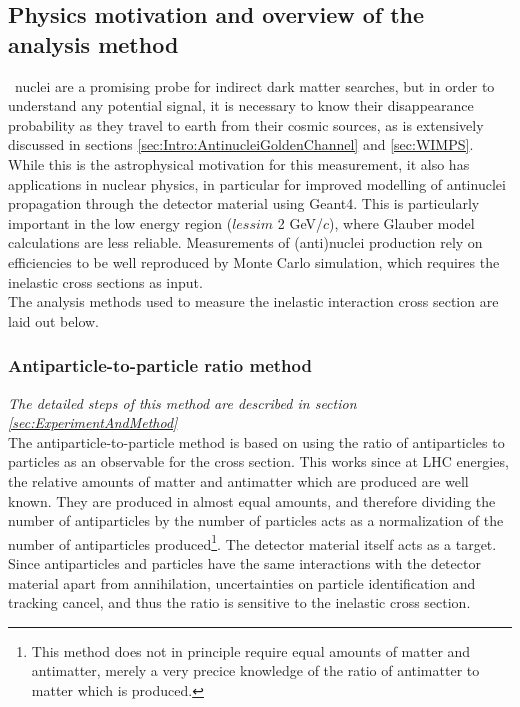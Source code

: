 \subsection{Physics motivation and overview of the analysis method}
\ahe\ nuclei are a promising probe for indirect dark matter searches, but in order to understand any potential signal, it is necessary to know their disappearance probability as they travel to earth from their cosmic sources, as is extensively discussed in sections \ref{sec:Intro:AntinucleiGoldenChannel} and \ref{sec:WIMPS}. While this is the astrophysical motivation for this measurement, it also has applications in nuclear physics, in particular for improved modelling of antinuclei propagation through the detector material using Geant4. This is particularly important in the low energy region ($lessim$ 2 GeV/$c$), where Glauber model calculations are less reliable. Measurements of (anti)nuclei production rely on efficiencies to be well reproduced by Monte Carlo simulation, which requires the inelastic cross sections as input. \\ 
The analysis methods used to measure the inelastic interaction cross section are laid out below. 
\subsubsection{Antiparticle-to-particle ratio method}
\textit{The detailed steps of this method are described in section \ref{sec:ExperimentAndMethod}}\\
The antiparticle-to-particle method is based on using the ratio of antiparticles to particles as an observable for the cross section. This works since at LHC energies, the relative amounts of matter and antimatter which are produced are well known. They are produced in almost equal amounts, and therefore dividing the number of antiparticles by the number of particles acts as a normalization of the number of antiparticles produced\footnote{This method does not in principle require equal amounts of matter and antimatter, merely a very precice knowledge of the ratio of antimatter to matter which is produced.}. The detector material itself acts as a target. Since antiparticles and particles have the same interactions with the detector material apart from annihilation, uncertainties on particle identification and tracking cancel, and thus the ratio is sensitive to the inelastic cross section. 
